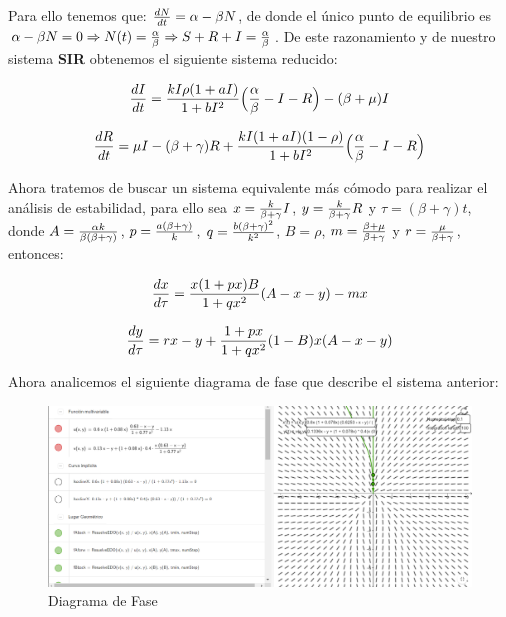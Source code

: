 \documentclass{article}
\begin{document}
Para ello tenemos que: ${dN\over dt}=\alpha-\beta N$, de donde el único punto de equilibrio es $\alpha-\beta N=0\Rightarrow N(t)={\alpha\over\beta}\Rightarrow S+R+I={\alpha\over\beta}$. De este razonamiento y de nuestro sistema \textbf{SIR} obtenemos el siguiente sistema reducido:

\begin{equation}
	{dI\over dt}={kI\rho (1+aI)\over 1+bI^2}\Big({\alpha\over\beta}-I-R\Big)-(\beta+\mu)I
\end{equation}

\begin{equation}
	{dR\over dt}=\mu I-(\beta+\gamma)R+{kI(1+aI)(1-\rho)\over 1+bI^2}\Big({\alpha\over\beta}-I-R\Big)
\end{equation}

Ahora tratemos de buscar un sistema equivalente m\'as c\'omodo para realizar el an\'alisis de estabilidad, para ello sea $x={k\over \beta +\gamma}I$, $y={k\over \beta +\gamma}R$ y $\tau = (\beta+\gamma)t$, donde $A={\alpha k\over \beta(\beta+\gamma)}$, $p={a(\beta+\gamma)\over k}$, $q={b(\beta+\gamma)^2\over k^2}$, $B=\rho$, $m={\beta+\mu\over \beta+\gamma}$ y $r={\mu\over \beta+\gamma}$, entonces:

\begin{equation}
	{dx\over d\tau}={x(1+px)B\over 1+qx^2}(A-x-y)-mx
\end{equation}

\begin{equation}
	{dy\over d\tau}=rx-y+{1+px\over 1+qx^2}(1-B)x(A-x-y)
\end{equation}

Ahora analicemos el siguiente diagrama de fase que describe el sistema anterior:

\begin{figure}[H]
    \centering
    \includegraphics[width=1\textwidth]{./images/Figure_2.png}
    \caption{Diagrama de Fase}
    \label{fig:phase_diagram}
\end{figure}
\end{document}
